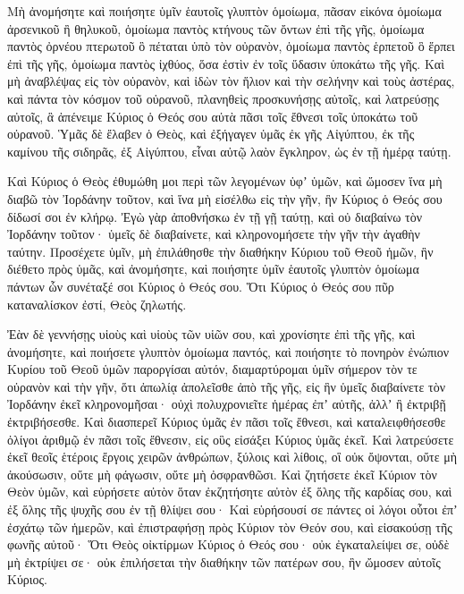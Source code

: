 {Μὴ ἀνομήσητε καὶ ποιήσητε ὑμῖν ἑαυτοῖς γλυπτὸν ὁμοίωμα, πᾶσαν εἰκόνα ὁμοίωμα ἀρσενικοῦ ἢ θηλυκοῦ,
ὁμοίωμα παντὸς κτήνους τῶν ὄντων ἐπὶ τῆς γῆς, ὁμοίωμα παντὸς ὀρνέου πτερωτοῦ ὃ πέταται ὑπὸ τὸν οὐρανὸν,
ὁμοίωμα παντὸς ἑρπετοῦ ὃ ἕρπει ἐπὶ τῆς γῆς, ὁμοίωμα παντὸς ἰχθύος, ὅσα ἐστὶν ἐν τοῖς ὕδασιν ὑποκάτω τῆς γῆς.
Καὶ μὴ ἀναβλέψας εἰς τὸν οὐρανὸν, καὶ ἰδὼν τὸν ἥλιον καὶ τὴν σελήνην καὶ τοὺς ἀστέρας, καὶ πάντα τὸν κόσμον τοῦ οὐρανοῦ, πλανηθεὶς προσκυνήσῃς αὐτοῖς, καὶ λατρεύσῃς αὐτοῖς, ἃ ἀπένειμε Κύριος ὁ Θεός σου αὐτὰ πᾶσι τοῖς ἔθνεσι τοῖς ὑποκάτω τοῦ οὐρανοῦ.
Ὑμᾶς δὲ ἔλαβεν ὁ Θεὸς, καὶ ἐξήγαγεν ὑμᾶς ἐκ γῆς Αἰγύπτου, ἐκ τῆς καμίνου τῆς σιδηρᾶς, ἐξ Αἰγύπτου, εἶναι αὐτῷ λαὸν ἔγκληρον, ὡς ἐν τῇ ἡμέρᾳ ταύτῃ.
\par }{\PP {}Καὶ Κύριος ὁ Θεὸς ἐθυμώθη μοι περὶ τῶν λεγομένων ὑφʼ ὑμῶν, καὶ ὤμοσεν ἵνα μὴ διαβῶ τὸν Ἰορδάνην τοῦτον, καὶ ἵνα μὴ εἰσέλθω εἰς τὴν γῆν, ἣν Κύριος ὁ Θεός σου δίδωσί σοι ἐν κλήρῳ.
Ἐγὼ γὰρ ἀποθνήσκω ἐν τῇ γῇ ταύτῃ, καὶ οὐ διαβαίνω τὸν Ἰορδάνην τοῦτον· ὑμεῖς δὲ διαβαίνετε, καὶ κληρονομήσετε τὴν γῆν τὴν ἀγαθὴν ταύτην.
Προσέχετε ὑμῖν, μὴ ἐπιλάθησθε τὴν διαθήκην Κύριου τοῦ Θεοῦ ἡμῶν, ἣν διέθετο πρὸς ὑμᾶς, καὶ ἀνομήσητε, καὶ ποιήσητε ὑμῖν ἑαυτοῖς γλυπτὸν ὁμοίωμα πάντων ὧν συνέταξέ σοι Κύριος ὁ Θεός σου.
Ὅτι Κύριος ὁ Θεός σου πῦρ καταναλίσκον ἐστί, Θεὸς ζηλωτής.
\par }{\PP {}Ἐὰν δὲ γεννήσῃς υἱοὺς καὶ υἱοὺς τῶν υἱῶν σου, καὶ χρονίσητε ἐπὶ τῆς γῆς, καὶ ἀνομήσητε, καὶ ποιήσετε γλυπτὸν ὁμοίωμα παντός, καὶ ποιήσητε τὸ πονηρὸν ἐνώπιον Κυρίου τοῦ Θεοῦ ὑμῶν παροργίσαι αὐτόν,
διαμαρτύρομαι ὑμῖν σήμερον τὸν τε οὐρανὸν καὶ τὴν γῆν, ὅτι ἀπωλίᾳ ἀπολεῖσθε ἀπὸ τῆς γῆς, εἰς ἣν ὑμεῖς διαβαίνετε τὸν Ἰορδάνην ἐκεῖ κληρονομῆσαι· οὐχὶ πολυχρονιεῖτε ἡμέρας ἐπʼ αὐτῆς, ἀλλʼ ἢ ἐκτριβῇ ἐκτριβήσεσθε.
Καὶ διασπερεῖ Κύριος ὑμᾶς ἐν πᾶσι τοῖς ἔθνεσι, καὶ καταλειφθήσεσθε ὀλίγοι ἀριθμῷ ἐν πᾶσι τοῖς ἔθνεσιν, εἰς οὓς εἰσάξει Κύριος ὑμᾶς ἐκεῖ.
Καὶ λατρεύσετε ἐκεῖ θεοῖς ἑτέροις ἔργοις χειρῶν ἀνθρώπων, ξύλοις καὶ λίθοις, οἳ οὐκ ὄψονται, οὔτε μὴ ἀκούσωσιν, οὔτε μὴ φάγωσιν, οὔτε μὴ ὀσφρανθῶσι.
Καὶ ζητήσετε ἐκεῖ Κύριον τὸν Θεὸν ὑμῶν, καὶ εὑρήσετε αὐτὸν ὅταν ἐκζητήσητε αὐτὸν ἐξ ὅλης τῆς καρδίας σου, καὶ ἐξ ὅλης τῆς ψυχῆς σου ἐν τῇ θλίψει σου·
Καὶ εὑρήσουσί σε πάντες οἱ λόγοι οὗτοι ἐπʼ ἐσχάτῳ τῶν ἡμερῶν, καὶ ἐπιστραφήσῃ πρὸς Κύριον τὸν Θεόν σου, καὶ εἰσακούσῃ τῆς φωνῆς αὐτοῦ·
Ὅτι Θεὸς οἰκτίρμων Κύριος ὁ Θεός σου· οὐκ ἐγκαταλείψει σε, οὐδὲ μὴ ἐκτρίψει σε· οὐκ ἐπιλήσεται τὴν διαθήκην τῶν πατέρων σου, ἣν ὤμοσεν αὐτοῖς Κύριος.
}
